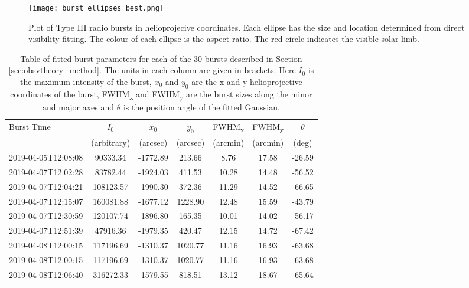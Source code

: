 \begin{figure}[ht]
\centering
\texttt{[image: burst\_ellipses\_best.png]}
\caption[Plot of Type III radio bursts in helioprojecive coordinates.]{Plot of Type III radio bursts in helioprojecive coordinates. Each ellipse has the size and location determined from direct visibility fitting. The colour of each ellipse is the aspect ratio. The red circle indicates the visible solar limb. }
\label{fig:synoptic_bursts}
\end{figure}

\begin{table}
\centering
\caption[Table of fitted burst parameters]{Table of fitted burst parameters for each of the 30 bursts described in Section \ref{sec:obsvtheory_method}. The units in each column are given in brackets. Here $I_0$ is the maximum intensity of the burst, $x_0$ and $y_0$ are the x and y helioprojective coordinates of the burst, FWHM\textsubscript{x} and FWHM\textsubscript{y} are the burst sizes along the minor and major axes and $\theta$ is the position angle of the fitted Gaussian.}
\label{tab:dataset}
\begin{tabular}{lcccccc}
\toprule
Burst Time & $I_0$  & $x_0$ & $y_0$  & FWHM\textsubscript{x} & FWHM\textsubscript{y} & $\theta$ \\
 & (arbitrary) & (arcsec) & (arcsec) & (arcmin) & (arcmin) &  (deg) \\
\midrule
2019-04-05T12:08:08 &   90333.34 & -1772.89 &   213.66 &    8.76 &   17.58 &  -26.59 \\
2019-04-07T12:02:28 &   83782.44 & -1924.03 &   411.53 &   10.28 &   14.48 &  -56.52 \\
2019-04-07T12:04:21 &  108123.57 & -1990.30 &   372.36 &   11.29 &   14.52 &  -66.65 \\
2019-04-07T12:15:07 &  160081.88 & -1677.12 &  1228.90 &   12.48 &   15.59 &  -43.79 \\
2019-04-07T12:30:59 &  120107.74 & -1896.80 &   165.35 &   10.01 &   14.02 &  -56.17 \\
2019-04-07T12:51:39 &   47916.36 & -1979.35 &   420.47 &   12.15 &   14.72 &  -67.42 \\
2019-04-08T12:00:15 &  117196.69 & -1310.37 &  1020.77 &   11.16 &   16.93 &  -63.68 \\
2019-04-08T12:00:15 &  117196.69 & -1310.37 &  1020.77 &   11.16 &   16.93 &  -63.68 \\
2019-04-08T12:06:40 &  316272.33 & -1579.55 &   818.51 &   13.12 &   18.67 &  -65.64 \\

\end{tabular}
\end{table}
